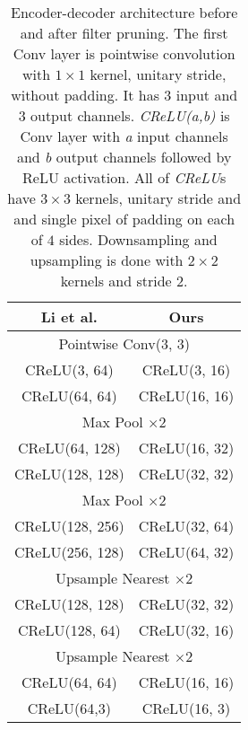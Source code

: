\documentclass[../Main.tex]{subfiles}
\begin{document}
    \begin{table}
    \begin{center}
        \begin{tabular}{|c|c|}
        \hline
         Li et al. \cite{Li2018} & Ours \\
        \hline
          \multicolumn{2}{|c|}{Pointwise Conv(3, 3)} \\
          \hline
          CReLU(3, 64)  & CReLU(3, 16)  \\
          \hline
          CReLU(64, 64) & CReLU(16, 16)  \\
          \hline
          \multicolumn{2}{|c|}{Max Pool $\times2$}      \\
          \hline
          CReLU(64, 128)  & CReLU(16, 32) \\
          \hline
          CReLU(128, 128)  & CReLU(32, 32)\\
          \hline
          \multicolumn{2}{|c|}{Max Pool $\times2$}    \\
          \hline
          CReLU(128, 256) & CReLU(32, 64)\\
          \hline
          CReLU(256, 128) & CReLU(64, 32)\\
          \hline
          \multicolumn{2}{|c|}{Upsample Nearest $\times2$}\\
          \hline
          CReLU(128, 128) & CReLU(32, 32)\\
          \hline
          CReLU(128, 64) & CReLU(32, 16)\\
          \hline
          \multicolumn{2}{|c|}{Upsample Nearest $\times2$}\\
          \hline
          CReLU(64, 64) & CReLU(16, 16) \\
          \hline
          CReLU(64,3) & CReLU(16, 3)\\
          \hline
        \end{tabular}
            \end{center}
        \caption{Encoder-decoder architecture before and after filter pruning.
        The first Conv layer is pointwise convolution with $1\times1$ kernel, 
        unitary stride, without padding. It has $3$ input and $3$ output channels.
        \textit{CReLU(a,b)} is Conv layer with \textit{a} input channels and 
        \textit{b} output channels followed by ReLU activation. All of 
        \textit{CReLU}s have $3\times3$ kernels, unitary stride and and single pixel
        of padding on each of $4$ sides. Downsampling and upsampling
        is done with $2\times2$ kernels and stride $2$.
        }
        \label{table:vgg}
    \end{table}
    
\end{document}
